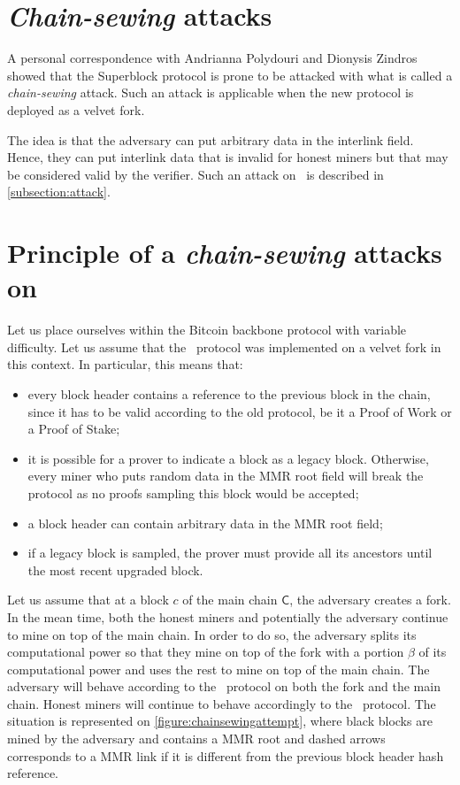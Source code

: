     \section{\textit{Chain-sewing} attacks}
      A personal correspondence with Andrianna Polydouri and Dionysis Zindros showed that the Superblock protocol is prone to be attacked with what is called a \textit{chain-sewing} attack. Such an attack is applicable when the new protocol is deployed as a velvet fork.
      
      The idea is that the adversary can put arbitrary data in the interlink field. Hence, they can put interlink data that is invalid for honest miners but that may be considered valid by the verifier. Such an attack on \FC\ is described in \autoref{subsection:attack}.
    \section{Principle of a \textit{chain-sewing} attacks on \FC}
      \label{subsection:attack}
      Let us place ourselves within the Bitcoin backbone protocol with variable difficulty. Let us assume that the \FC\ protocol was implemented on a velvet fork in this context. In particular, this means that:
      
      \begin{itemize}
        \item every block header contains a reference to the previous block in the chain, since it has to be valid according to the old protocol, be it a Proof of Work or a Proof of Stake;
        \item it is possible for a prover to indicate a block as a legacy block. Otherwise, every miner who puts random data in the MMR root field will break the protocol as no proofs sampling this block would be accepted;
        \item a block header can contain arbitrary data in the MMR root field;
        \item if a legacy block is sampled, the prover must provide all its ancestors until the most recent upgraded block.
      \end{itemize}
      
      Let us assume that at a block \(c\) of the main chain \(\mathsf{C}\), the adversary creates a fork. In the mean time, both the honest miners and potentially the adversary continue to mine on top of the main chain. In order to do so, the adversary splits its computational power so that they mine on top of the fork with a portion \(\beta\) of its computational power and uses the rest to mine on top of the main chain. The adversary will behave according to the \FC\ protocol on both the fork and the main chain. Honest miners will continue to behave accordingly to the \FC\ protocol. The situation is represented on \autoref{figure:chainsewingattempt}, where black blocks are mined by the adversary and contains a MMR root and dashed arrows corresponds to a MMR link if it is different from the previous block header hash reference.
    
